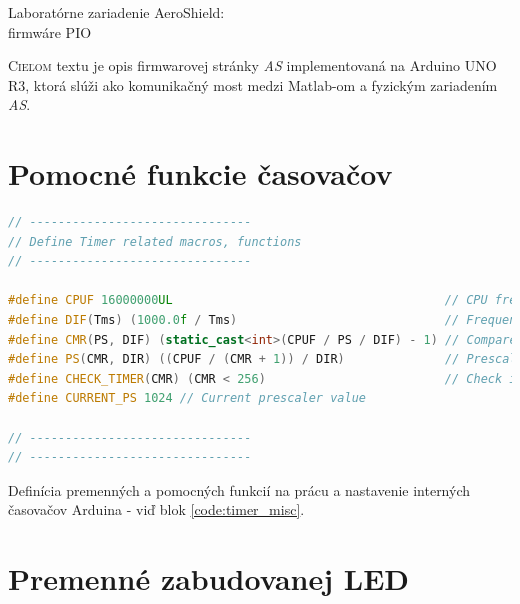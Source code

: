 \documentclass[a4paper, 10pt, ]{article}
\begin{document}
\begin{flushleft}
    Laboratórne zariadenie AeroShield:\\ firmwáre PIO
\end{flushleft}

\bigskip

\normalsize
\normalfont

\lstset{style=mystyle}










\noindent
\lettrine[lines=1, nindent=1pt, loversize=0.0]{C}{ieľom}
textu je opis firmwarovej stránky \emph{AS} implementovaná na Arduino UNO R3, ktorá slúži ako komunikačný most medzi Matlab-om a fyzickým zariadením \emph{AS}.


\section{Pomocné funkcie časovačov}
%
\begin{lstlisting}[caption=Obslužné funkcie interných časovačov Arduina., label={code:timer_misc}, language=C++]
// -------------------------------
// Define Timer related macros, functions
// -------------------------------

#define CPUF 16000000UL                                      // CPU frequency for Arduino UNO
#define DIF(Tms) (1000.0f / Tms)                             // Frequency divider macro
#define CMR(PS, DIF) (static_cast<int>(CPUF / PS / DIF) - 1) // Compare match register value calculation macro
#define PS(CMR, DIR) ((CPUF / (CMR + 1)) / DIR)              // Prescaler value calculation macro
#define CHECK_TIMER(CMR) (CMR < 256)                         // Check if CMR value fits in 8-bit register
#define CURRENT_PS 1024 // Current prescaler value

// -------------------------------
// -------------------------------
\end{lstlisting}

Definícia premenných a pomocných funkcií na prácu a nastavenie interných časovačov Arduina - viď blok \ref{code:timer_misc}.

\section{Premenné zabudovanej LED}
\end{document}
